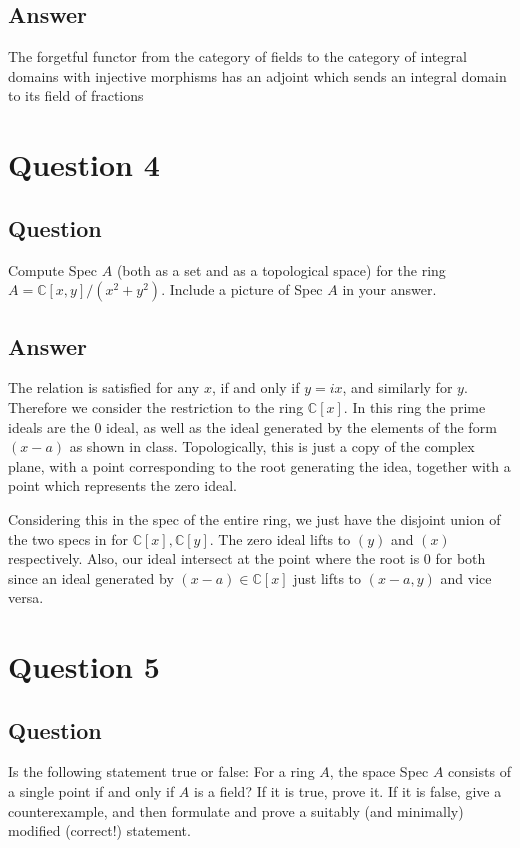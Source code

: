 \documentclass[11pt]{article}
\begin{document}
\subsection{Answer}
The forgetful functor from the category of fields to the category of integral domains with injective morphisms has an adjoint which sends an integral domain to its field of fractions

\section{Question 4}
\subsection{Question}
Compute Spec $A$ (both as a set and as a topological space) for the ring $A = \mathbb{C}[x,y]/(x^2 + y^2 )$. Include a picture of Spec $A$ in your answer.
\subsection{Answer}
The relation is satisfied for any $x$, if and only if $y= i x$, and similarly for $y$. Therefore we consider the restriction to the ring $\mathbb{C}[x]$. In this ring the prime ideals are the 0 ideal, as well as the ideal generated by the elements of the form $(x-a)$ as shown in class. Topologically, this is just a copy of the complex plane, with a point corresponding to the root generating the idea, together with a point which represents the zero ideal.

Considering this in the spec of the entire ring, we just have the disjoint union of the two specs in for $\mathbb{C}[x], \mathbb{C}[y]$. The zero ideal  lifts to $(y)$ and $(x)$ respectively. Also, our ideal intersect at the point where the root is 0 for both since an ideal generated by $(x-a) \in \mathbb{C}[x] $ just lifts to $(x-a,y)$ and vice versa.
\section{Question 5}
\subsection{Question}
Is the following statement true or false: For a ring $A$, the space Spec $A$ consists of a single point if and only if $A$ is a field? If it is true, prove it. If it is false, give a counterexample, and then formulate and prove a suitably (and minimally) modified (correct!) statement.
\end{document}
